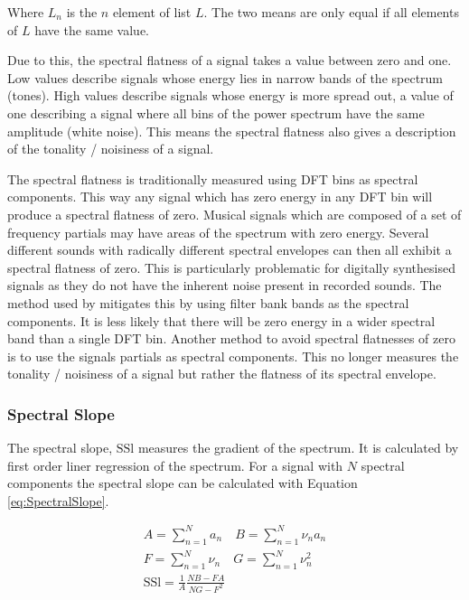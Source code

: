 			Where $L_{n}$ is the $n$ element of list $L$. The two means are only equal if all
			elements of $L$ have the same value.

			Due to this, the spectral flatness of a signal takes a value between zero and one. Low values
			describe signals whose energy lies in narrow bands of the spectrum (tones). High values describe
			signals whose energy is more spread out, a value of one describing a signal where all bins of the
			power spectrum have the same amplitude (white noise). This means the spectral flatness also gives a
			description of the tonality / noisiness of a signal.

			The spectral flatness is traditionally measured using DFT bins as spectral components. This way any
			signal which has zero energy in any DFT bin will produce a spectral flatness of zero. Musical
			signals which are composed of a set of frequency partials may have areas of the spectrum with zero
			energy. Several different sounds with radically different spectral envelopes can then all exhibit a
			spectral flatness of zero. This is particularly problematic for digitally synthesised signals as
			they do not have the inherent noise present in recorded sounds. The method used by
			\citet{peeters2004a} mitigates this by using filter bank bands as the spectral components. It is
			less likely that there will be zero energy in a wider spectral band than a single DFT bin. Another
			method to avoid spectral flatnesses of zero is to use the signals partials as spectral components.
			This no longer measures the tonality / noisiness of a signal but rather the flatness of its
			spectral envelope.

		\subsubsection*{Spectral Slope}
			The spectral slope, $\textrm{SSl}$ measures the gradient of the spectrum. It is calculated by first
			order liner regression of the spectrum. For a signal with $N$ spectral components the spectral
			slope can be calculated with Equation \ref{eq:SpectralSlope}.

			\begin{gather}
				A = \sum_{n = 1}^{N} a_{n}
				\quad 
				B = \sum_{n = 1}^{N} \nu_{n}a_{n} \nonumber \\
				F = \sum_{n = 1}^{N} \nu_{n} \quad G = \sum_{n = 1}^{N} \nu_{n}^{2} \nonumber \\
				\textrm{SSl} = \frac{1}{A} \frac{NB - FA}{NG - F^{2}}
				\label{eq:SpectralSlope}
			\end{gather}

